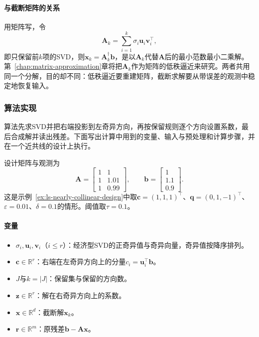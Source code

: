 \paragraph{与截断矩阵的关系}
用矩阵写，令
\begin{equation}
 \bm A_k=\sum_{i=1}^k\sigma_i\bm u_i\bm v_i^\top ,
 \label{eq:ls-truncated-matrix}
\end{equation}
即只保留前$k$项的SVD，则$\bm x_k=\bm A_k^\dagger\bm b$，是以$\bm A_k$代替$\bm A$后的最小范数最小二乘解。第~\ref{chap:matrix-approximation}章将把$\bm A_k$作为矩阵的低秩逼近来研究。两者共用同一个分解，目的却不同：低秩逼近要重建矩阵，截断求解要从带误差的观测中稳定地恢复输入。

\subsubsection{算法实现}
算法先求SVD并把右端投影到左奇异方向，再按保留规则逐个方向设置系数，最后合成解并读出残差。下面写出计算中用到的变量、输入与预处理和计算步骤，并在一个近共线的设计上执行。

\begin{example}[近共线设计的截断求解]
\label{ex:ls-tsvd-steps}
设计矩阵与观测为
\[
 \bm A=\begin{bmatrix}1&1\\1&1.01\\1&0.99\end{bmatrix},\qquad
 \bm b=\begin{bmatrix}1\\1.1\\0.9\end{bmatrix}.
\]
这是示例~\ref{ex:ls-nearly-collinear-design}中取$\bm c=(1,1,1)^\top$、$\bm q=(0,1,-1)^\top$、$\varepsilon=0.01$、$\delta=0.1$的情形。阈值取$\tau=0.1$。
\end{example}

\paragraph{变量}
\begin{itemize}
 \item $\sigma_i,\bm u_i,\bm v_i$（$i\leq r$）：经济型SVD的正奇异值与奇异向量，奇异值按降序排列。
 \item $\bm c\in\mathbb R^r$：右端在左奇异方向上的分量$c_i=\bm u_i^\top\bm b$。
 \item $J$与$k=|J|$：保留集与保留的方向数。
 \item $\bm z\in\mathbb R^r$：解在右奇异方向上的系数。
 \item $\bm x\in\mathbb R^d$：截断解$\bm x_k$。
 \item $\bm r\in\mathbb R^m$：原残差$\bm b-\bm A\bm x$。
\end{itemize}

